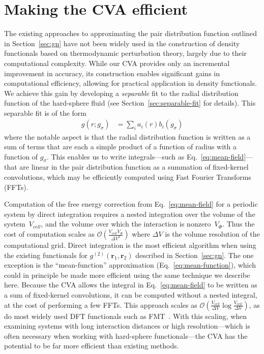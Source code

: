 \documentclass[letterpaper,twocolumn,amsmath,amssymb,pre,aps,10pt]{revtex4-1}
\newcommand{\rr}{\textbf{r}}
\begin{document}
\section{Making the CVA efficient}
\label{sec:efficient}
The existing approaches to approximating the pair distribution
function outlined in Section~\ref{sec:gn} have not been widely used in
the construction of density functionals based on thermodynamic
perturbation theory, largely due to their computational complexity.
While our CVA provides only an incremental improvement in accuracy,
its construction enables significant gains in computational
efficiency, allowing for practical application in density functionals.
We achieve this gain by developing a \emph{separable} fit to the radial
distribution function of the hard-sphere fluid (see
Section~\ref{sec:separable-fit} for details).  This separable fit is
of the form
\begin{align}
  g(r; g_\sigma) &= \sum_{i} a_i(r) b_i(g_\sigma)
\end{align}
where the notable aspect is that the radial distribution function is
written as a sum of terms that are each a simple product of a function
of radius with a function of $g_\sigma$.  This enables us to write
integrals---such as Eq.~\ref{eq:mean-field}---that are linear in the
pair distribution function as a summation of fixed-kernel
convolutions, which may be efficiently computed using Fast Fourier
Transforms (FFTs).

\newcommand\Vcell{V_{\textit{cell}}}
\newcommand\Vinteraction{V_{\Phi}}

Computation of the free energy correction from Eq.~\ref{eq:mean-field}
for a periodic system by direct integration requires a nested
integration over the volume of the system~$\Vcell$, and the volume
over which the interaction is nonzero~$\Vinteraction$.  Thus the cost
of computation scales as
$\mathcal{O}\left(\frac{\Vcell\Vinteraction}{\Delta V^2}\right)$ where
$\Delta V$ is the volume resolution of the computational grid.  Direct
integration is the most efficient algorithm when using the existing
functionals for $g^{(2)}(\rr_1,\rr_2)$ described in
Section~\ref{sec:gn}.  The one exception is the ``mean-function''
approximation (Eq.~\ref{eq:mean-function}), which could in principle
be made more efficient using the same technique we describe here.
Because the CVA allows the integral in Eq.~\ref{eq:mean-field} to be
written as a sum of fixed-kernel convolutions, it can be computed
without a nested integral, at the cost of performing a few FFTs.  This
approach scales as $\mathcal{O}\left(\frac{\Vcell}{\Delta
  V}\log\frac{\Vcell}{\Delta V}\right)$, as do most widely used DFT
functionals such as FMT~\cite{rosenfeld1989free, roth2002whitebear}.
%
With this scaling, when examining systems with long interaction
distances or high resolution---which is often necessary when working
with hard-sphere functionals---the CVA has the potential to be far
more efficient than existing methods.
\end{document}
